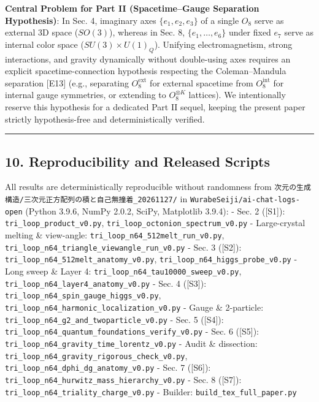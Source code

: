 \documentclass[
  a4paper,
]{article}
\begin{document}
\textbf{Central Problem for Part II (Spacetime--Gauge Separation
Hypothesis)}: In Sec. 4, imaginary axes \(\{e_1,e_2,e_3\}\) of a single
\(O_8\) serve as external 3D space (\(SO(3)\)), whereas in Sec. 8,
\(\{e_1,\dots,e_6\}\) under fixed \(e_7\) serve as internal color space
(\(SU(3)\times U(1)_Q\)). Unifying electromagnetism, strong
interactions, and gravity dynamically without double-using axes requires
an explicit spacetime-connection hypothesis respecting the
Coleman--Mandula separation {[}E13{]} (e.g., separating
\(O_8^{\mathrm{ext}}\) for external spacetime from
\(O_8^{\mathrm{int}}\) for internal gauge symmetries, or extending to
\(O_8^{\otimes K}\) lattices). We intentionally reserve this hypothesis
for a dedicated Part II sequel, keeping the present paper strictly
hypothesis-free and deterministically verified.

\begin{center}\rule{0.5\linewidth}{0.5pt}\end{center}

\subsection{10. Reproducibility and Released
Scripts}\label{reproducibility-and-released-scripts}

All results are deterministically reproducible without randomness from
\texttt{次元の生成構造/三次元正方配列の積と自己無撞着\_20261127/} in
\texttt{WurabeSeiji/ai-chat-logs-open} (Python 3.9.6, NumPy 2.0.2,
SciPy, Matplotlib 3.9.4): - Sec. 2 ({[}S1{]}):
\texttt{tri\_loop\_product\_v0.py},
\texttt{tri\_loop\_octonion\_spectrum\_v0.py} - Large-crystal melting \&
view-angle: \texttt{tri\_loop\_n64\_512melt\_run\_v0.py},
\texttt{tri\_loop\_n64\_triangle\_viewangle\_run\_v0.py} - Sec. 3
({[}S2{]}): \texttt{tri\_loop\_n64\_512melt\_anatomy\_v0.py},
\texttt{tri\_loop\_n64\_higgs\_probe\_v0.py} - Long sweep \& Layer 4:
\texttt{tri\_loop\_n64\_tau10000\_sweep\_v0.py},
\texttt{tri\_loop\_n64\_layer4\_anatomy\_v0.py} - Sec. 4 ({[}S3{]}):
\texttt{tri\_loop\_n64\_spin\_gauge\_higgs\_v0.py},
\texttt{tri\_loop\_n64\_harmonic\_localization\_v0.py} - Gauge \&
2-particle: \texttt{tri\_loop\_n64\_g2\_and\_twoparticle\_v0.py} - Sec.
5 ({[}S4{]}):
\texttt{tri\_loop\_n64\_quantum\_foundations\_verify\_v0.py} - Sec. 6
({[}S5{]}): \texttt{tri\_loop\_n64\_gravity\_time\_lorentz\_v0.py} -
Audit \& dissection:
\texttt{tri\_loop\_n64\_gravity\_rigorous\_check\_v0.py},
\texttt{tri\_loop\_n64\_dphi\_dg\_anatomy\_v0.py} - Sec. 7 ({[}S6{]}):
\texttt{tri\_loop\_n64\_hurwitz\_mass\_hierarchy\_v0.py} - Sec. 8
({[}S7{]}): \texttt{tri\_loop\_n64\_triality\_charge\_v0.py} - Builder:
\texttt{build\_tex\_full\_paper.py}
\end{document}
